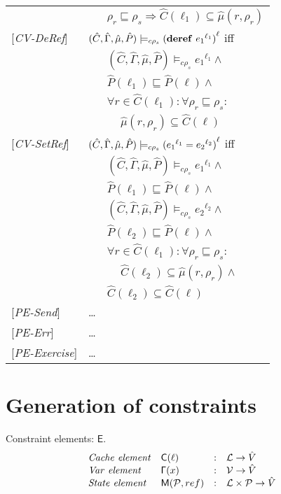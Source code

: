 \documentclass[[12pt,a4paper,twoside,openrigh]{article}
\newcommand{\Cat}[0]{\hat{C}}
\newcommand{\muat}[0]{\hat{\mu}}
\newcommand{\Env}[0]{\hat{\Gamma}}
\newcommand{\Pat}[0]{\hat{P}}
\newcommand{\cenvs}{(\Cat,\Env,\muat,\Pat)}
\newcommand{\ccest}[1]{\cenvs \models_{c \rho_s} #1}
\newcommand{\ccestl}[1]{\cenvs \models_{c \rho_s} {(#1)}^{\ell}}
\newcommand{\lbt}[1]{{e_#1}^{\ell_#1}}
\begin{document}
\begin{tabular} {l l l l}
&&\multicolumn{2}{l}{$\rho_r \sqsubseteq \rho_s \Rightarrow \Cat(\ell_1) \subseteq \muat(r, \rho_r) $}\\
{[\textit{CV-DeRef}]}&\multicolumn{3}{l}{$\ccestl {\deref {\lbt 1}} $ iff}\\
&&\multicolumn{2}{l}{$ \ccest {\lbt 1}\wedge $}\\
&&\multicolumn{2}{l}{$\Pat(\ell_1) \sqsubseteq \Pat(\ell) \wedge$}\\
&&\multicolumn{2}{l}{$\forall r \in \Cat(\ell_1) : \forall \rho_r \sqsubseteq \rho_s :$}\\
&&&$\muat(r, \rho_r) \subseteq \Cat(\ell)$ \\
{[\textit{CV-SetRef}]}&\multicolumn{3}{l}{$\ccestl {\setref {\lbt 1} {\lbt 2}} $ iff}\\
&&\multicolumn{2}{l}{$ \ccest {\lbt 1} \wedge $}\\
&&\multicolumn{2}{l}{$ \Pat(\ell_1) \sqsubseteq \Pat(\ell) \wedge $}\\
&&\multicolumn{2}{l}{$ \ccest {\lbt 2} \wedge $}\\
&&\multicolumn{2}{l}{$ \Pat(\ell_2) \sqsubseteq \Pat(\ell) \wedge $}\\
&&\multicolumn{2}{l}{$ \forall r \in \Cat(\ell_1) : \forall \rho_r \sqsubseteq \rho_s :$}\\
&&&$\Cat(\ell_2) \subseteq \muat(r, \rho_r) \wedge$ \\
&&\multicolumn{2}{l}{$\Cat(\ell_2) \subseteq \Cat(\ell) $} \\
{[\textit{PE-Send}]}& \dots \\
{[\textit{PE-Err}]}& \dots \\
{[\textit{PE-Exercise}]}& \dots \\
\end{tabular}

\section{Generation of constraints}
\newcommand{\genl}[1]{\mathcal{C}_{*\rho_s}\llbracket (#1)^\ell \rrbracket}
\newcommand{\gen}[1]{\mathcal{C}_{*\rho_s}\llbracket (#1) \rrbracket}
\newcommand{\Cel}{\mathsf{C}}
\newcommand{\Rel}{\mathsf{\Gamma}}
\newcommand{\Pel}{\mathsf{P}}
\newcommand{\Mel}{\mathsf{M}}
\newcommand{\El}{\mathsf{E}}
\newcommand{\braces}[1]{\{ #1 \} }
\newcommand{\parens}[1]{\( #1 \) }

Constraint elements: $\El$.
\[
\begin{array}{llcl}
\mathit{Cache\ element} & \Cel(\ell)& : & \labs \rightarrow \absvalues \\
\mathit{Var\ element} & \Rel(x) & : & \vars \rightarrow \absvalues \\
\mathit{State\ element} & \Mel(\perms, ref) & : & \labs \times \perms \rightarrow \absvalues \\
\end{array}
\]
\end{document}
